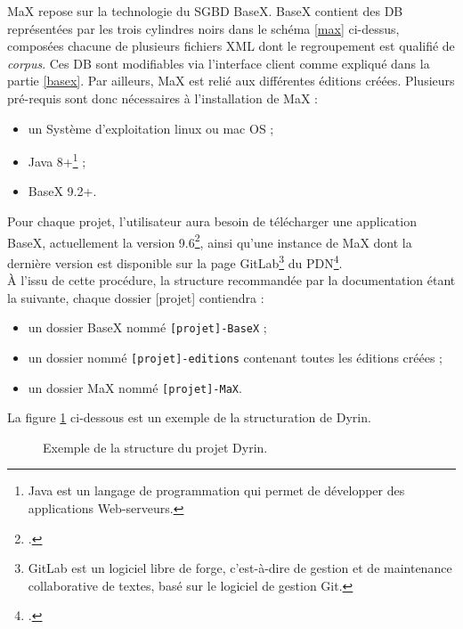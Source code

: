 \documentclass[a4paper,12pt,twoside]{book}
\begin{document}
MaX repose sur la technologie du \acrlong{SGBD} BaseX. BaseX contient des \acrfull{DB} représentées par les trois cylindres noirs dans le schéma \ref{max} ci-dessus, composées chacune de plusieurs fichiers XML dont le regroupement est qualifié de \textit{corpus}. Ces \acrshort{DB} sont modifiables via l'interface client comme expliqué dans la partie \ref{basex}. Par ailleurs, MaX est relié aux différentes éditions créées.
Plusieurs pré-requis sont donc nécessaires à l'installation de MaX :
\begin{itemize}
    \item un Système d'exploitation linux ou mac OS ;
    \item Java 8+\footnote{Java est un langage de programmation qui permet de développer des applications Web-serveurs.} ;
    \item BaseX 9.2+.
\end{itemize}

Pour chaque projet, l'utilisateur aura besoin de télécharger une application BaseX, actuellement la version 9.6\footcite{download-basex}, ainsi qu'une instance de MaX dont la dernière version est disponible sur la page GitLab\footnote{GitLab est un logiciel libre de forge, c'est-à-dire de gestion et de maintenance collaborative de textes, basé sur le logiciel de gestion Git. } du PDN\footcite{pdn-certic}.\\
À l'issu de cette procédure, la structure recommandée par la documentation étant la suivante, chaque dossier [projet] contiendra :
\begin{itemize}
    \item un dossier BaseX nommé \texttt{[projet]-BaseX} ;
    \item un dossier nommé \texttt{[projet]-editions} contenant toutes les éditions créées ;
    \item un dossier MaX nommé \texttt{[projet]-MaX}.
\end{itemize}

La figure \ref{structure_dyrin} ci-dessous est un exemple de la structuration de Dyrin.

\begin{figure}[H]
    \centering
    \caption{Exemple de la structure du projet Dyrin.}
    \label{structure_dyrin}
\end{figure}
\end{document}
